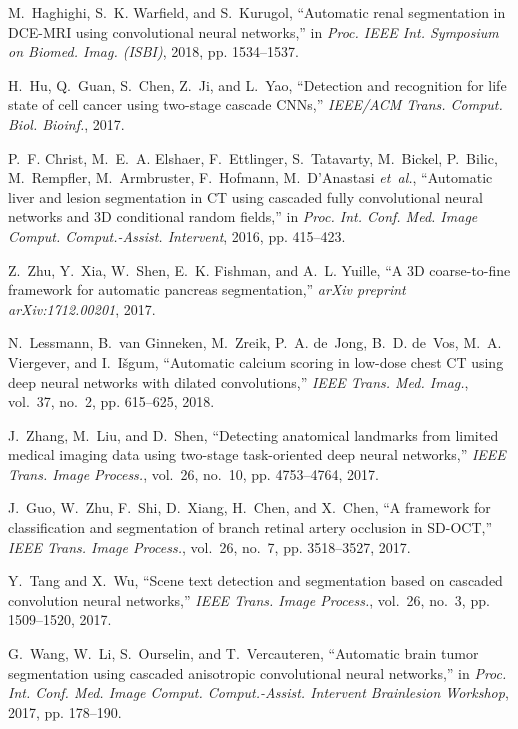 \documentclass[journal,twoside]{IEEEtran}
\begin{document}
\begin{thebibliography}{55}
M.~Haghighi, S.~K. Warfield, and S.~Kurugol, ``Automatic renal segmentation in {DCE-MRI} using convolutional neural networks,'' in \emph{Proc. IEEE Int. Symposium on Biomed. Imag. (ISBI)}, 2018, pp. 1534--1537.

H.~Hu, Q.~Guan, S.~Chen, Z.~Ji, and L.~Yao, ``Detection and recognition for life state of cell cancer using two-stage cascade {CNNs},'' \emph{IEEE/ACM Trans. Comput. Biol. Bioinf.}, 2017.

P.~F. Christ, M.~E.~A. Elshaer, F.~Ettlinger, S.~Tatavarty, M.~Bickel, P.~Bilic, M.~Rempfler, M.~Armbruster, F.~Hofmann, M.~D’Anastasi \emph{et~al.}, ``Automatic liver and lesion segmentation in {CT} using cascaded fully convolutional neural networks and {3D} conditional random fields,'' in \emph{Proc. Int. Conf. Med. Image Comput. Comput.-Assist. Intervent}, 2016, pp. 415--423.

Z.~Zhu, Y.~Xia, W.~Shen, E.~K. Fishman, and A.~L. Yuille, ``A {3D} coarse-to-fine framework for automatic pancreas segmentation,'' \emph{arXiv	preprint arXiv:1712.00201}, 2017.

N.~Lessmann, B.~van Ginneken, M.~Zreik, P.~A. de~Jong, B.~D. de~Vos, M.~A. Viergever, and I.~I{\v{s}}gum, ``Automatic calcium scoring in low-dose chest CT using deep neural networks with dilated convolutions,'' \emph{IEEE Trans. Med. Imag.}, vol.~37, no.~2, pp. 615--625, 2018.



J.~Zhang, M.~Liu, and D.~Shen, ``Detecting anatomical landmarks from limited medical imaging data using two-stage task-oriented deep neural networks,'' \emph{IEEE Trans. Image Process.}, vol.~26, no.~10, pp. 4753--4764, 2017.



J.~Guo, W.~Zhu, F.~Shi, D.~Xiang, H.~Chen, and X.~Chen, ``A framework for classification and segmentation of branch retinal artery occlusion in SD-OCT,'' \emph{IEEE Trans. Image Process.}, vol.~26, no.~7, pp. 3518--3527, 2017.

Y.~Tang and X.~Wu, ``Scene text detection and segmentation based on cascaded convolution neural networks,'' \emph{IEEE Trans. Image Process.}, vol.~26, no.~3, pp. 1509--1520, 2017.

G.~Wang, W.~Li, S.~Ourselin, and T.~Vercauteren, ``Automatic brain tumor segmentation using cascaded anisotropic convolutional neural networks,'' in \emph{Proc. Int. Conf. Med. Image Comput. Comput.-Assist. Intervent Brainlesion Workshop}, 2017, pp. 178--190.


\end{thebibliography}
\end{document}
